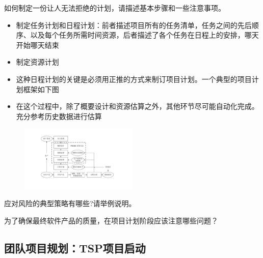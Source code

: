 \begin{problem}
如何制定一份让人无法拒绝的计划，请描述基本步骤和一些注意事项。

\begin{itemize}
    \item 制定任务计划和日程计划：前者描述项目所有的任务清单，任务之间的先后顺序、以及每个任务所需时间资源，后者描述了各个任务在日程上的安排，哪天开始哪天结束
    \item 制定资源计划
    \item 这种日程计划的关键是必须用正推的方式来制订项目计划。一个典型的项目计划框架如下图
    \item 在这个过程中，除了概要设计和资源估算之外，其他环节尽可能自动化完成。充分参考历史数据进行估算
\end{itemize}

\begin{figure}[H]
    \vspace{-0.7em}
	\centering
	\includegraphics[width=0.5\textwidth]{images/通用计划框架.pdf}
    \vspace{-1em}
\end{figure}
\end{problem}

\begin{problem}
应对风险的典型策略有哪些?请举例说明。
\end{problem}

\begin{problem}
为了确保最终软件产品的质量，在项目计划阶段应该注意哪些问题？
\end{problem}

\subsection{团队项目规划：TSP项目启动}

